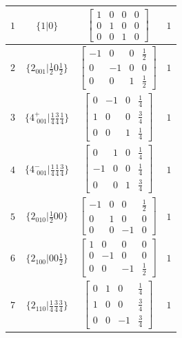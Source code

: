 \documentclass[fleqn,8pt]{jsarticle}
\begin{document}
\begin{longtable}{cccc}
$ 1 $ & $ \{1|0\} $ & $ \begin{bmatrix} 1 & 0 & 0 & 0 \\ 0 & 1 & 0 & 0 \\ 0 & 0 & 1 & 0 \end{bmatrix} $ & $ 1 $ \\ \hline
$ 2 $ & $ \{2{}_{001}|\frac{1}{2} 0 \frac{1}{2}\} $ & $ \begin{bmatrix} -1 & 0 & 0 & \frac{1}{2} \\ 0 & -1 & 0 & 0 \\ 0 & 0 & 1 & \frac{1}{2} \end{bmatrix} $ & $ 1 $ \\ \hline
$ 3 $ & $ \{4^{+}_{\,\,001}|\frac{1}{4} \frac{3}{4} \frac{1}{4}\} $ & $ \begin{bmatrix} 0 & -1 & 0 & \frac{1}{4} \\ 1 & 0 & 0 & \frac{3}{4} \\ 0 & 0 & 1 & \frac{1}{4} \end{bmatrix} $ & $ 1 $ \\ \hline
$ 4 $ & $ \{4^{-}_{\,\,001}|\frac{1}{4} \frac{1}{4} \frac{3}{4}\} $ & $ \begin{bmatrix} 0 & 1 & 0 & \frac{1}{4} \\ -1 & 0 & 0 & \frac{1}{4} \\ 0 & 0 & 1 & \frac{3}{4} \end{bmatrix} $ & $ 1 $ \\ \hline
$ 5 $ & $ \{2{}_{010}|\frac{1}{2} 0 0\} $ & $ \begin{bmatrix} -1 & 0 & 0 & \frac{1}{2} \\ 0 & 1 & 0 & 0 \\ 0 & 0 & -1 & 0 \end{bmatrix} $ & $ 1 $ \\ \hline
$ 6 $ & $ \{2{}_{100}|0 0 \frac{1}{2}\} $ & $ \begin{bmatrix} 1 & 0 & 0 & 0 \\ 0 & -1 & 0 & 0 \\ 0 & 0 & -1 & \frac{1}{2} \end{bmatrix} $ & $ 1 $ \\ \hline
$ 7 $ & $ \{2{}_{110}|\frac{1}{4} \frac{3}{4} \frac{3}{4}\} $ & $ \begin{bmatrix} 0 & 1 & 0 & \frac{1}{4} \\ 1 & 0 & 0 & \frac{3}{4} \\ 0 & 0 & -1 & \frac{3}{4} \end{bmatrix} $ & $ 1 $ \\ \hline

\end{longtable}
\end{document}
